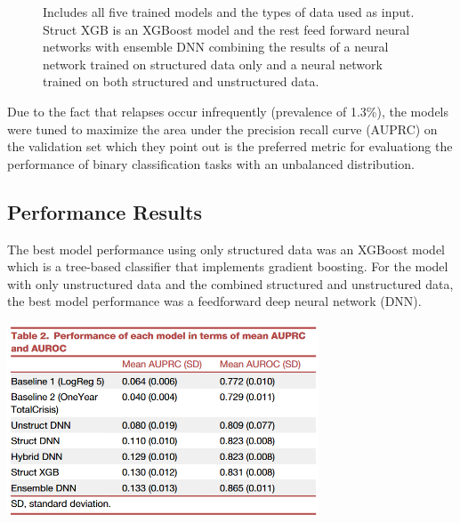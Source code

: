 \documentclass[
  letterpaper,
  DIV=11,
  numbers=noendperiod]{scrartcl}
\begin{document}
\begin{figure}


\caption{\label{fig-experimentaldesign}Includes all five trained models
and the types of data used as input. Struct XGB is an XGBoost model and
the rest feed forward neural networks with ensemble DNN combining the
results of a neural network trained on structured data only and a neural
network trained on both structured and unstructured data.}

\end{figure}%

Due to the fact that relapses occur infrequently (prevalence of 1.3\%),
the models were tuned to maximize the area under the precision recall
curve (AUPRC) on the validation set which they point out is the
preferred metric for evaluationg the performance of binary
classification tasks with an unbalanced distribution.

\subsection{Performance Results}\label{performance-results}

The best model performance using only structured data was an XGBoost
model which is a tree-based classifier that implements gradient
boosting. For the model with only unstructured data and the combined
structured and unstructured data, the best model performance was a
feedforward deep neural network (DNN).

\includegraphics[width=3.64583in,height=\textheight]{images/paste-2.png}
\end{document}
